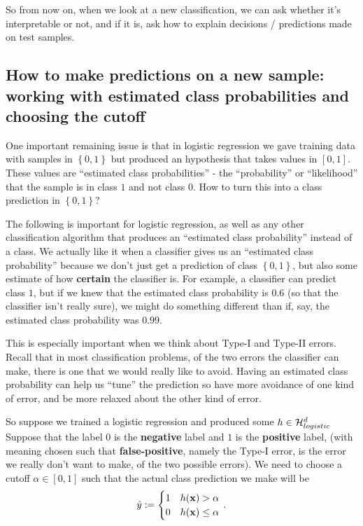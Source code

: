 So from now on, when we look at a new classification, we can ask whether it's
interpretable or not, and if it is, ask how to explain decisions / predictions
made on test samples. 

\subsection{How to make predictions on a new sample: working with estimated
class probabilities and choosing the cutoff}

One important remaining issue is that in logistic regression we gave training
data with samples in $\left\{ 0,1 \right\}$ but produced an hypothesis that
takes values in $[0,1]$. These values are ``estimated class probabilities'' -
the ``probability'' or ``likelihood'' that the sample is in class $1$ and not
class $0$. How to turn this into a class prediction in $\left\{ 0,1
\right\}$? 

The following is important for logistic regression, as well as any other
classification algorithm that produces an ``estimated class probability''
instead of a class. We actually like it when a classifier gives us an
``estimated class probability'' because we don't just get a prediction of class
$\left\{ 0,1 \right\}$, but also some estimate of how {\bf certain} the
classifier is. For example, a classifier can predict class $1$, but if we knew
that the estimated class probability is $0.6$ (so that the classifier isn't
really sure), we might do something different than if, say, the estimated class
probability was $0.99$. 

This is especially important when we think about Type-I and Type-II errors.
Recall that in most classification problems, of the two errors the classifier
can make, there is one that we would really like to avoid. Having an estimated
class probability can help us ``tune'' the prediction so have more avoidance of
one kind of error, and be more relaxed about the other kind of error.

So suppose we trained a logistic regression and produced some $h\in\mathcal{H}_{logistic}^d$
Suppose that the label $0$ is the {\bf negative} label and $1$ is the {\bf
positive} label, (with meaning chosen such that {\bf false-positive}, namely the
  Type-I error, is the error we really don't want to make, of the two possible
errors). 
We need to choose a cutoff $\alpha\in[0,1]$ such that the actual class
prediction we make will be 
\[\hat{y} := \begin{cases} 1 & h(\mathbf{x})>\alpha \\ 0 &
      h(\mathbf{x}) \leq \alpha \end{cases}\,.\] 

